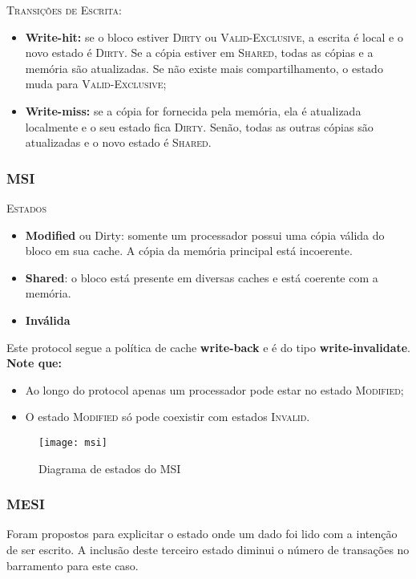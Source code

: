 \textsc{Transições de Escrita:}
\begin{itemize}
  \item \textbf{Write-hit:} se o bloco estiver \textsc{Dirty} ou \textsc{Valid-Exclusive}, a escrita é local e o novo estado é \textsc{Dirty}. Se a cópia estiver em \textsc{Shared}, todas as cópias e a memória são atualizadas. Se não existe mais compartilhamento, o estado muda para \textsc{Valid-Exclusive};

  \item \textbf{Write-miss:} se a cópia for fornecida pela memória, ela é atualizada localmente e o seu estado fica \textsc{Dirty}. Senão, todas as outras cópias são atualizadas e o novo estado é \textsc{Shared}.
\end{itemize}



\subsubsection{MSI}
\textsc{Estados}\\
\begin{itemize}
  \item \textbf{Modified} ou Dirty: somente um processador possui uma cópia válida do bloco em sua cache. A cópia da memória principal está incoerente.
  \item \textbf{Shared}: o bloco está presente em diversas caches e está coerente com a memória.
  \item \textbf{Inválida}
\end{itemize}

Este protocol segue a política de cache \textbf{write-back} e é do tipo \textbf{write-invalidate}. \textbf{Note que:}
\begin{itemize}
  \item Ao longo do protocol apenas um processador pode estar no estado \textsc{Modified};

  \item O estado \textsc{Modified} só pode coexistir com estados \textsc{Invalid}.
\end{itemize}

\begin{figure}[ht]
  \centering
  \texttt{[image: msi]}
  \label{fig:msi-automata}
  \caption{Diagrama de estados do MSI}
\end{figure}



\subsubsection{MESI}
Foram propostos para explicitar o estado onde um dado foi lido com a intenção de ser escrito. A inclusão deste terceiro estado diminui o número de transações no barramento para este caso.

